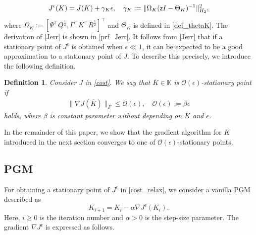 \documentclass[preprint,5p,times,twocolumn]{elsarticle}
\newtheorem{definition}{Definition}
\begin{document}
\begin{align}\label{Jerr}
 J^{\epsilon}(K) =J(K) + \gamma_K{\epsilon}, \quad \gamma_K := \|\Omega_K ({\sf z}I - \Theta_K)^{-1}\|_{H_2}^2, 
\end{align}
where $\Omega_K := [\Psi^{\top}Q^{\frac{1}{2}}, \Gamma^{\top}K^{\top}R^{\frac{1}{2}}]^{\top}$ and $\Theta_K$ is defined in \eqref{def_thetaK}. The derivation of \eqref{Jerr} is shown in  \ref{prf_Jerr}. It follows from \eqref{Jerr} that if a stationary point of $J^{\epsilon}$ is obtained when $\epsilon \ll 1$, it can be expected to be a good approximation to a stationary point of $J$. To describe this precisely, we introduce the following definition.
\begin{definition}
 Consider $J$ in \eqref{cost}. We say that $\overline{K} \in \mathbb K$ is {\it $\mathcal O(\epsilon)$-stationary point} if 
 \begin{align}\label{def:eps_stationary}
        \|\nabla J(\overline{K})\|_F \leq \mathcal O({\epsilon}), \quad   \mathcal O(\epsilon) := \beta \epsilon
    \end{align}
    holds, where $\beta$ is constant parameter without depending on $\overline{K}$ and $\epsilon$. 
\end{definition}
In the remainder of this paper, we show that the gradient algorithm for $K$ introduced in the next section converges to one of $\mathcal O(\epsilon)$-stationary points. 


\subsection{PGM}
For obtaining a stationary point of $J^{\epsilon}$ in \eqref{cost_relax}, we consider a vanilla PGM described as
\begin{equation}
\label{gd}
    K_{i+1} = K_{i}-\alpha\nabla J^{\epsilon}(K_i). 
\end{equation}
Here, $i \geq 0$ is the iteration number and $\alpha > 0$ is the step-size parameter. The gradient $\nabla J^{\epsilon}$ is expressed as follows.
\end{document}
